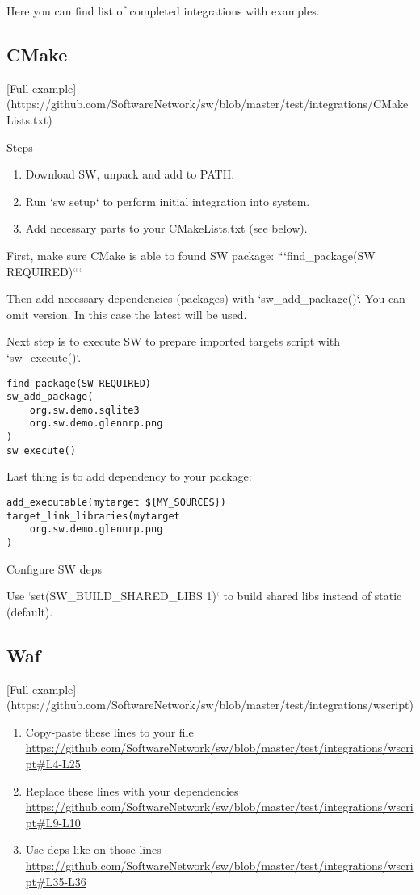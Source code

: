 Here you can find list of completed integrations with examples.

\subsection{CMake}


[Full example](https://github.com/SoftwareNetwork/sw/blob/master/test/integrations/CMakeLists.txt)

Steps
\begin{enumerate}
\item
Download SW, unpack and add to PATH.
\item
Run `sw setup` to perform initial integration into system.
\item
Add necessary parts to your CMakeLists.txt (see below).
\end{enumerate}

First, make sure CMake is able to found SW package: ```find_package(SW REQUIRED)```

Then add necessary dependencies (packages) with `sw_add_package()`. You can omit version. In this case the latest will be used.

Next step is to execute SW to prepare imported targets script with `sw_execute()`.

\begin{verbatim}
find_package(SW REQUIRED)
sw_add_package(
    org.sw.demo.sqlite3
    org.sw.demo.glennrp.png
)
sw_execute()
\end{verbatim}

Last thing is to add dependency to your package:

\begin{verbatim}
add_executable(mytarget ${MY_SOURCES})
target_link_libraries(mytarget 
    org.sw.demo.glennrp.png
)
\end{verbatim}

Configure SW deps

Use `set(SW_BUILD_SHARED_LIBS 1)` to build shared libs instead of static (default).

\subsection{Waf}

[Full example](https://github.com/SoftwareNetwork/sw/blob/master/test/integrations/wscript)

\begin{enumerate}
\item
Copy-paste these lines to your file \url{https://github.com/SoftwareNetwork/sw/blob/master/test/integrations/wscript#L4-L25}

\item
Replace these lines with your dependencies \url{https://github.com/SoftwareNetwork/sw/blob/master/test/integrations/wscript#L9-L10}

\item
Use deps like on those lines \url{https://github.com/SoftwareNetwork/sw/blob/master/test/integrations/wscript#L35-L36}

\end{enumerate}

